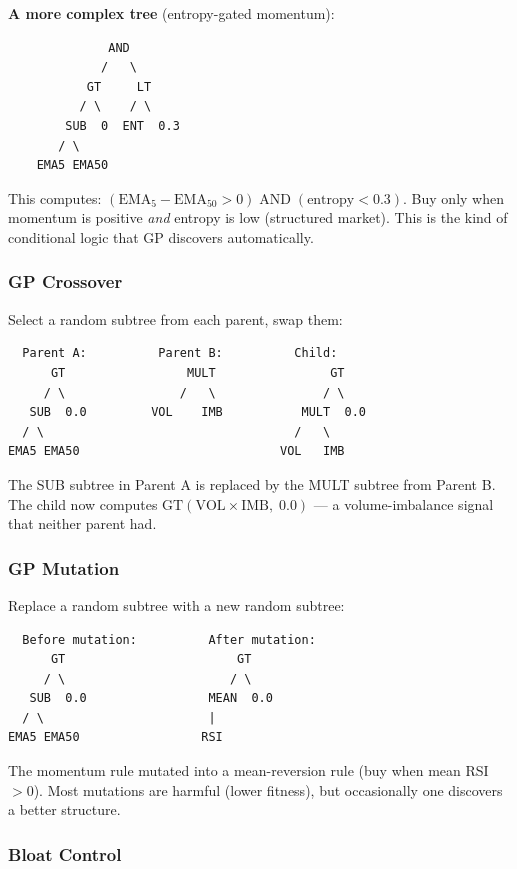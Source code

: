 \documentclass[11pt,a4paper]{article}
\begin{document}
\textbf{A more complex tree} (entropy-gated momentum):

\begin{verbatim}
              AND
             /   \
           GT     LT
          / \    / \
        SUB  0  ENT  0.3
       / \
    EMA5 EMA50
\end{verbatim}

This computes: $(\text{EMA}_5 - \text{EMA}_{50} > 0) \;\text{AND}\; (\text{entropy} < 0.3)$. Buy only when momentum is positive \textit{and} entropy is low (structured market). This is the kind of conditional logic that GP discovers automatically.

\subsubsection{GP Crossover}

Select a random subtree from each parent, swap them:

\begin{verbatim}
  Parent A:          Parent B:          Child:
      GT                 MULT                GT
     / \                /   \               / \
   SUB  0.0         VOL    IMB           MULT  0.0
  / \                                   /   \
EMA5 EMA50                            VOL   IMB
\end{verbatim}

The SUB subtree in Parent A is replaced by the MULT subtree from Parent B. The child now computes $\text{GT}(\text{VOL} \times \text{IMB}, \; 0.0)$ --- a volume-imbalance signal that neither parent had.

\subsubsection{GP Mutation}

Replace a random subtree with a new random subtree:

\begin{verbatim}
  Before mutation:          After mutation:
      GT                        GT
     / \                       / \
   SUB  0.0                 MEAN  0.0
  / \                       |
EMA5 EMA50                 RSI
\end{verbatim}

The momentum rule mutated into a mean-reversion rule (buy when mean RSI $> 0$). Most mutations are harmful (lower fitness), but occasionally one discovers a better structure.

\subsubsection{Bloat Control}
\end{document}
